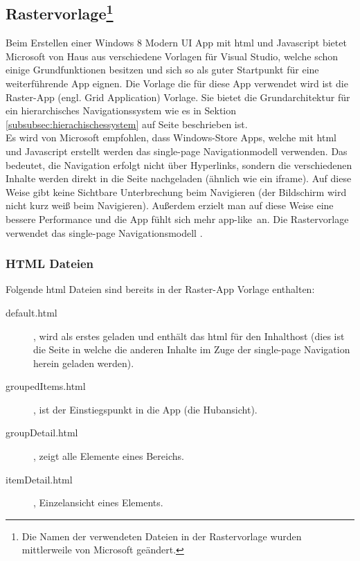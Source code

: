 \documentclass[12pt,a4paper]{scrartcl}
\begin{document}
\subsection[Rastervorlage] {Rastervorlage\footnote{Die Namen der verwendeten Dateien in der Rastervorlage wurden mittlerweile von Microsoft geändert.}}
\label{subsec:rastervorlage}
Beim Erstellen einer Windows 8 Modern UI App mit \ac{html} und Javascript bietet Microsoft von Haus aus verschiedene Vorlagen für Visual Studio, welche schon einige Grundfunktionen besitzen und sich so als guter Startpunkt für eine weiterführende App eignen. Die Vorlage die für diese App verwendet wird ist die Raster-App (engl. Grid Application) Vorlage. Sie bietet die Grundarchitektur für ein hierarchisches Navigationssystem wie es in Sektion \ref{subsubsec:hierachischessystem} auf Seite \pageref{subsubsec:hierachischessystem} beschrieben ist.\\
Es wird von Microsoft empfohlen, dass Windows-Store Apps, welche mit \ac{html} und Javascript erstellt werden das single-page Navigationmodell verwenden. Das bedeutet, die Navigation erfolgt nicht über Hyperlinks, sondern die verschiedenen Inhalte werden direkt in die Seite nachgeladen (ähnlich wie ein iframe). Auf diese Weise gibt keine Sichtbare Unterbrechung beim Navigieren (der Bildschirm wird nicht kurz weiß beim Navigieren). Außerdem erzielt man auf diese Weise eine bessere Performance und die App fühlt sich mehr \glqq app-like\grqq\ an. Die Rastervorlage verwendet das single-page Navigationsmodell \citep{MicrosoftSinglePage2013}.\\  

\subsubsection{HTML Dateien}
\label{subsubsec:htmldateien} 
Folgende \ac{html} Dateien sind bereits in der Raster-App Vorlage enthalten:
\begin{description}
	\item[default.html], wird als erstes geladen und enthält das \ac{html} für den Inhalthost (dies ist die Seite in welche die anderen Inhalte im Zuge der single-page Navigation herein geladen werden).
	\item[groupedItems.html], ist der Einstiegspunkt in die App (die Hubansicht).
	\item[groupDetail.html], zeigt alle Elemente eines Bereichs.
	\item[itemDetail.html], Einzelansicht eines Elements.
\end{description}
\end{document}
